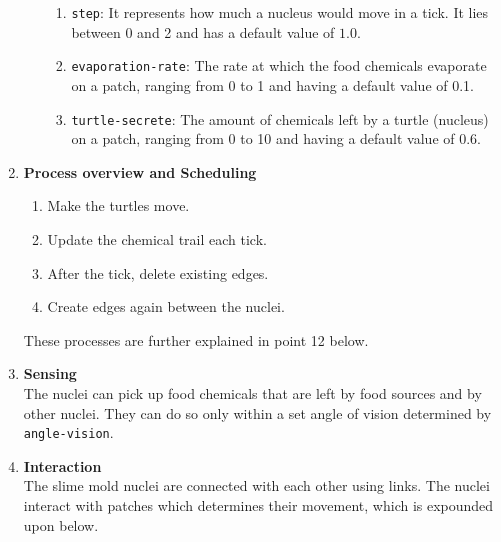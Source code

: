 \documentclass[a4paper, 12pt]{article}
\begin{document}
\begin{enumerate}
\begin{enumerate}
\begin{enumerate}
            \item \texttt{step}: It represents how much a nucleus would move in a tick. It lies between 0 and 2 and has a default value of $1.0$.
            \item \texttt{evaporation-rate}: The rate at which the food chemicals evaporate on a patch, ranging from 0 to 1 and having a default value of 0.1. 
            \item \texttt{turtle-secrete}: The amount of chemicals left by a turtle (nucleus) on a patch, ranging from 0 to 10 and having a default value of 0.6. 
        \end{enumerate} 
    \end{enumerate}

    
    \item \textbf{Process overview and Scheduling} 
    \begin{enumerate}
        \item Make the turtles move. 
        \item Update the chemical trail each tick.
        \item After the tick, delete existing edges. 
        \item Create edges again between the nuclei. 
       \end{enumerate} 
        These processes are further explained in point 12 below. 
    
    \item \textbf{Sensing} \\
    The nuclei can pick up food chemicals that are left by food sources and by other nuclei. They can do so only within a set angle of vision determined by \texttt{angle-vision}. 
    \item \textbf{Interaction} \\
    The slime mold nuclei are connected with each other using links. The nuclei interact with patches which determines their movement, which is expounded upon below.  
    

\end{enumerate}
\end{document}
